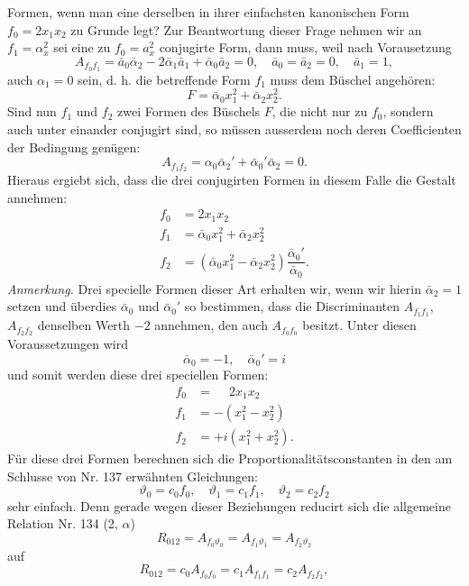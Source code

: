 Formen, wenn man eine derselben in ihrer einfachsten kanonischen
Form $f_0 = 2x_1x_2$ zu Grunde legt? Zur Beantwortung dieser Frage
nehmen wir an $f_1 = \alpha_x^2$ sei eine zu $f_0 = a_x^2$ conjugirte Form, dann
muss, weil nach Vorausetzung %
\[
A_{f_0f_1} = \bar a_0\bar\alpha_2 - 2\bar\alpha_1\bar a_1 + \bar\alpha_0\bar a_2 = 0, \quad \bar a_0 = \bar a_2 = 0, \quad \bar a_1 = 1,
\]
auch $\alpha_1 = 0$ sein, d. h. die betreffende Form $f_1$ muss dem Büschel
angehören:
\[
F = \bar\alpha_0 x_1^2 + \bar\alpha_2 x_2^2.
\]
Sind nun $f_1$ und $f_2$ zwei Formen des Büschels $F$, die nicht nur zu $f_0$,
sondern auch unter einander conjugirt sind, so müssen ausserdem noch
deren Coefficienten der Bedingung genügen:
\[
A_{f_1f_2} = \alpha_0\bar\alpha_2' + \bar\alpha_0'\bar\alpha_2 = 0.
\]
Hieraus ergiebt sich, dass die drei conjugirten Formen in diesem Falle
die Gestalt annehmen:
\[
\begin{aligned}
f_0 &= 2x_1x_2 \\
f_1 &= \bar\alpha_0 x_1^2 + \bar\alpha_2 x_2^2 \\
f_2 &= (\bar\alpha_0 x_1^2 - \bar\alpha_2 x_2^2)\dfrac{\bar\alpha_0'}{\bar\alpha_0}.
\end{aligned}
\]
\textit{Anmerkung.} Drei specielle Formen dieser Art erhalten wir, wenn
wir hierin $\bar\alpha_2 = 1$ setzen und überdies $\bar\alpha_0$ und $\bar\alpha_0'$ so bestimmen, dass
die Discriminanten $A_{f_1f_1}$, $A_{f_2f_2}$ denselben Werth $-2$ annehmen, den
auch $A_{f_0f_0}$ besitzt. Unter diesen Voraussetzungen wird
\[
\bar\alpha_0 = -1, \quad \bar\alpha_0' = i
\]
und somit werden diese drei speciellen Formen:
\[
\begin{aligned}
f_0 &= \phantom{-}2x_1x_2 \\
f_1 &= -(x_1^2 - x_2^2) \\
f_2 &= +i(x_1^2 + x_2^2).
\end{aligned}
\]
Für diese drei Formen berechnen sich die Proportionalitätsconstanten
in den am Schlusse von Nr. 137 erwähnten Gleichungen:
\[
\vartheta_0 = c_0f_0, \quad \vartheta_1 = c_1f_1, \quad \vartheta_2 = c_2f_2
\]
sehr einfach. Denn gerade wegen dieser Beziehungen reducirt sich
die allgemeine Relation Nr. 134 (2, $\alpha$)
\[
R_{012} = A_{f_0\vartheta_0} = A_{f_1\vartheta_1} = A_{f_2\vartheta_2}
\]
auf
\[
R_{012} = c_0A_{f_0f_0} = c_1A_{f_1f_1} = c_2A_{f_2f_2},
\]


